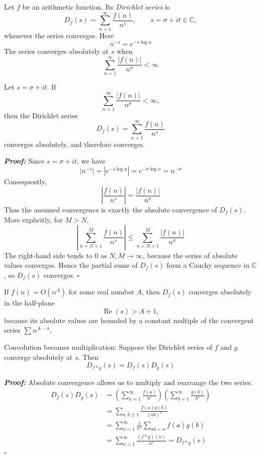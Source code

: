 \documentclass[a4paper,11pt,abstracton]{scrartcl}
\theoremstyle{dotlessP}
\theoremstyle{dotlessS}
\theoremstyle{remark}
\theoremstyle{definition}
\begin{document}
\begin{definition_box}
Let $f$ be an arithmetic function. Its \emph{Dirichlet series} is
\[
    D_f(s)=\sum_{n=1}^{\infty}\frac{f(n)}{n^s},
    \qquad s=\sigma+it\in\mathbb{C},
\]
whenever the series converges. Here
\[
    n^{-s}=e^{-s\log n}
\]
The series converges absolutely at $s$ when
\[
    \sum_{n=1}^{\infty}\frac{|f(n)|}{n^\sigma}<\infty
\]
\end{definition_box}

\begin{remark_box}
Let $s=\sigma+it$. If
\[
    \sum_{n=1}^{\infty}\frac{|f(n)|}{n^\sigma}<\infty,
\]
then the Dirichlet series
\[
    D_f(s)=\sum_{n=1}^{\infty}\frac{f(n)}{n^s}
\]
converges absolutely, and therefore converges.
\end{remark_box}

\begin{claim_box}
\textbf{\textit{Proof:}}
Since $s=\sigma+it$, we have
\[
    |n^{-s}|=|e^{-s\log n}|
      =e^{-\sigma\log n}=n^{-\sigma}
\]
Consequently,
\[
    \left|\frac{f(n)}{n^s}\right|
      =\frac{|f(n)|}{n^\sigma}
\]
Thus the assumed convergence is exactly the absolute convergence of
$D_f(s)$. More explicitly, for $M>N$,
\[
    \left|\sum_{n=N+1}^{M}\frac{f(n)}{n^s}\right|
      \leq\sum_{n=N+1}^{M}\frac{|f(n)|}{n^\sigma}
\]
The right-hand side tends to $0$ as $N,M\to\infty$, because the
series of absolute values converges. Hence the partial sums of
$D_f(s)$ form a Cauchy sequence in $\mathbb{C}$, so $D_f(s)$ converges.
\hfill$\square$
\end{claim_box}

\begin{remark_box}
If $f(n)=O(n^A)$ for some real number $A$, then $D_f(s)$ converges
absolutely in the half-plane
\[
    \operatorname{Re}(s)>A+1,
\]
because its absolute values are bounded by a constant multiple of the
convergent series $\sum n^{A-\sigma}$.
\end{remark_box}

\begin{mainbox}{Convolution becomes multiplication:}
Suppose the Dirichlet series of $f$ and $g$ converge absolutely at
$s$. Then
\[
    D_{f*g}(s)=D_f(s)D_g(s)
\]
\end{mainbox}

\begin{claim_box}
\textbf{\textit{Proof:}}
Absolute convergence allows us to multiply and rearrange the two
series:
\begin{align*}
    D_f(s)D_g(s)
      &=\left(\sum_{a=1}^{\infty}\frac{f(a)}{a^s}\right)
        \left(\sum_{b=1}^{\infty}\frac{g(b)}{b^s}\right)\\
      &=\sum_{a,b\geq1}\frac{f(a)g(b)}{(ab)^s}\\
      &=\sum_{n=1}^{\infty}\frac{1}{n^s}
        \sum_{ab=n}f(a)g(b)\\
      &=\sum_{n=1}^{\infty}\frac{(f*g)(n)}{n^s}
       =D_{f*g}(s)
\end{align*}
\hfill$\square$
\end{claim_box}
\end{document}

